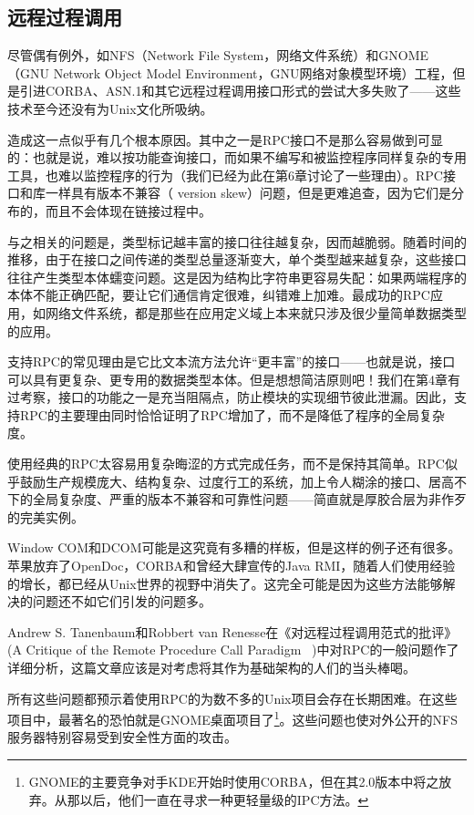 \documentclass[12pt,oneside]{ctexbook}
\begin{document}
\begin{common-format}
\subsection{远程过程调用}
尽管偶有例外，如NFS（Network File System，网络文件系统）和GNOME （GNU Network Object Model Environment，GNU网络对象模型环境）工程，但是引进CORBA、ASN.1和其它远程过程调用接口形式的尝试大多失败了——这些技术至今还没有为Unix文化所吸纳。

造成这一点似乎有几个根本原因。其中之一是RPC接口不是那么容易做到可显的：也就是说，难以按功能查询接口，而如果不编写和被监控程序同样复杂的专用工具，也难以监控程序的行为（我们已经为此在第6章讨论了一些理由）。RPC接口和库一样具有版本不兼容（ version skew）问题，但是更难追查，因为它们是分布的，而且不会体现在链接过程中。

与之相关的问题是，类型标记越丰富的接口往往越复杂，因而越脆弱。随着时间的推移，由于在接口之间传递的类型总量逐渐变大，单个类型越来越复杂，这些接口往往产生类型本体蠕变问题。这是因为结构比字符串更容易失配：如果两端程序的本体不能正确匹配，要让它们通信肯定很难，纠错难上加难。最成功的RPC应用，如网络文件系统，都是那些在应用定义域上本来就只涉及很少量简单数据类型的应用。

支持RPC的常见理由是它比文本流方法允许“更丰富”的接口——也就是说，接口可以具有更复杂、更专用的数据类型本体。但是想想简洁原则吧！我们在第4章有过考察，接口的功能之一是充当阻隔点，防止模块的实现细节彼此泄漏。因此，支持RPC的主要理由同时恰恰证明了RPC增加了，而不是降低了程序的全局复杂度。

使用经典的RPC太容易用复杂晦涩的方式完成任务，而不是保持其简单。RPC似乎鼓励生产规模庞大、结构复杂、过度行工的系统，加上令人糊涂的接口、居高不下的全局复杂度、严重的版本不兼容和可靠性问题——简直就是厚胶合层为非作歹的完美实例。

Window COM和DCOM可能是这究竟有多糟的样板，但是这样的例子还有很多。苹果放弃了OpenDoc，CORBA和曾经大肆宣传的Java RMI，随着人们使用经验的增长，都已经从Unix世界的视野中消失了。这完全可能是因为这些方法能够解决的问题还不如它们引发的问题多。

Andrew S. Tanenbaum和Robbert van Renesse在《对远程过程调用范式的批评》(A Critique of the Remote Procedure Call Paradigm ~\cite{Tanenbaum-VanRenesse})中对RPC的一般问题作了详细分析，这篇文章应该是对考虑将其作为基础架构的人们的当头棒喝。

所有这些问题都预示着使用RPC的为数不多的Unix项目会存在长期困难。在这些项目中，最著名的恐怕就是GNOME桌面项目了\footnote{GNOME的主要竞争对手KDE开始时使用CORBA，但在其2.0版本中将之放弃。从那以后，他们一直在寻求一种更轻量级的IPC方法。}。这些问题也使对外公开的NFS服务器特别容易受到安全性方面的攻击。


\end{common-format}
\end{document}
